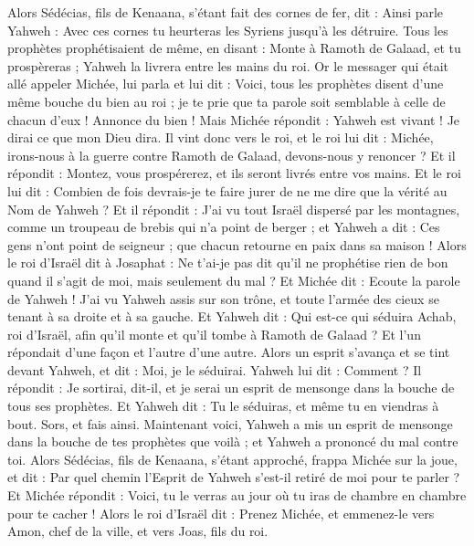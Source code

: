 \begin{multicols}{2}
Alors Sédécias, fils de Kenaana, s'étant fait des cornes de fer, dit : Ainsi parle Yahweh : Avec ces cornes tu heurteras les Syriens jusqu'à les détruire.
Tous les prophètes prophétisaient de même, en disant : Monte à Ramoth de Galaad, et tu prospèreras ; Yahweh la livrera entre les mains du roi.
Or le messager qui était allé appeler Michée, lui parla et lui dit : Voici, tous les prophètes disent d'une même bouche du bien au roi ; je te prie que ta parole soit semblable à celle de chacun d’eux ! Annonce du bien !
Mais Michée répondit : Yahweh est vivant ! Je dirai ce que mon Dieu dira.
Il vint donc vers le roi, et le roi lui dit : Michée, irons-nous à la guerre contre Ramoth de Galaad, devons-nous y renoncer ? Et il répondit : Montez, vous prospérerez, et ils seront livrés entre vos mains.
Et le roi lui dit : Combien de fois devrais-je te faire jurer de ne me dire que la vérité au Nom de Yahweh ?
Et il répondit : J'ai vu tout Israël dispersé par les montagnes, comme un troupeau de brebis qui n'a point de berger ; et Yahweh a dit : Ces gens n'ont point de seigneur ; que chacun retourne en paix dans sa maison !
Alors le roi d'Israël dit à Josaphat : Ne t'ai-je pas dit qu'il ne prophétise rien de bon quand il s'agit de moi, mais seulement du mal ?
Et Michée dit : Ecoute la parole de Yahweh ! J'ai vu Yahweh assis sur son trône, et toute l'armée des cieux se tenant à sa droite et à sa gauche.
Et Yahweh dit : Qui est-ce qui séduira Achab, roi d'Israël, afin qu'il monte et qu'il tombe à Ramoth de Galaad ?  Et l'un répondait d'une façon et l'autre d'une autre.
Alors un esprit s'avança et se tint devant Yahweh, et dit : Moi, je le séduirai. Yahweh lui dit : Comment ?
Il répondit : Je sortirai, dit-il, et je serai un esprit de mensonge dans la bouche de tous ses prophètes. Et Yahweh dit : Tu le séduiras, et même tu en viendras à bout. Sors, et fais ainsi.
Maintenant voici, Yahweh a mis un esprit de mensonge dans la bouche de tes prophètes que voilà ; et Yahweh a prononcé du mal contre toi.
Alors Sédécias, fils de Kenaana, s'étant approché, frappa Michée sur la joue, et dit : Par quel chemin l'Esprit de Yahweh s'est-il retiré de moi pour te parler ?
Et Michée répondit : Voici, tu le verras au jour où tu iras de chambre en chambre pour te cacher !
Alors le roi d'Israël dit : Prenez Michée, et emmenez-le vers Amon, chef de la ville, et vers Joas, fils du roi.

\end{multicols}
